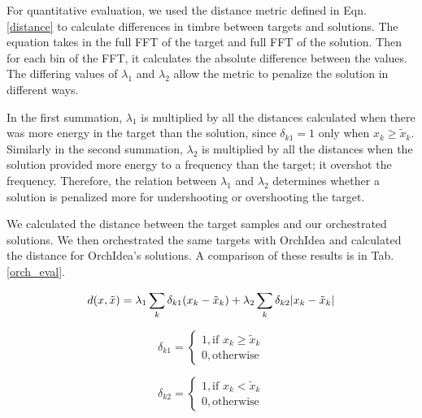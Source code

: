\documentclass{article}
\begin{document}
For quantitative evaluation, we used the distance metric defined in Eqn. \eqref{distance} to calculate differences in timbre between targets and solutions. The equation takes in the full FFT of the target and full FFT of the solution. Then for each bin of the FFT, it calculates the absolute difference between the values. The differing values of $\lambda_1$ and $\lambda_2$ allow the metric to penalize the solution in different ways. 

In the first summation, $\lambda_1$ is multiplied by all the distances calculated when there was more energy in the target than the solution, since $\delta_{k1} = 1$ only when $x_k \ge \tilde{x}_k$. Similarly in the second summation, $\lambda_2$ is multiplied by all the distances when the solution provided more energy to a frequency than the target; it overshot the frequency. Therefore, the relation between $\lambda_1$ and $\lambda_2$ determines whether a solution is penalized more for undershooting or overshooting the target.

We calculated the distance between the target samples and our orchestrated solutions. We then orchestrated the same targets with OrchIdea and calculated the distance for OrchIdea's solutions. A comparison of these results is in Tab. \ref{orch_eval}.

\begin{equation}\label{distance}
d(x, \tilde{x}) =\lambda_1 \sum_k \delta_{k1}(x_k - \tilde{x}_k) + \lambda_2 \sum_k \delta_{k2}|x_k - \tilde{x	}_k| \\
\end{equation}

\begin{equation}
\delta_{k1} = 
\begin{cases}
1, \text{if   } x_k \ge \tilde{x}_k \\
0, \text{otherwise}
\end{cases} 
\end{equation}

\begin{equation}
\delta_{k2} = 
\begin{cases}
1, \text{if   } x_k < \tilde{x}_k \\
0, \text{otherwise}
\end{cases}
\end{equation}
\end{document}

